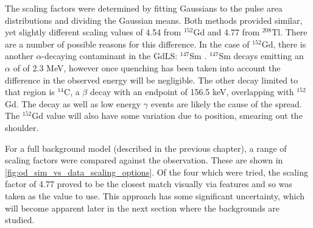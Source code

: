 \par
The scaling factors were determined by fitting Gaussians to the pulse area distributions and dividing the Gaussian means.
Both methods provided similar, yet slightly different scaling values of 4.54 from ${}^{152}$Gd and 4.77 from ${}^{208}$Tl.
There are a number of possible reasons for this difference.
In the case of ${}^{152}$Gd, there is another $\alpha$-decaying contaminant in the GdLS: ${}^{147}$Sm \cite{scotthaselschwardt_thesis_ref}.
${}^{147}$Sm decays emitting an $\alpha$ of of 2.3 MeV, however once quenching has been taken into account the difference in the observed energy will be negligible.
The other decay limited to that region is ${}^{14}$C, a $\beta$ decay with an endpoint of 156.5 keV, overlapping with ${}^{152}$Gd.
The decay as well as low energy $\gamma$ events are likely the cause of the spread.
The ${}^{152}$Gd value will also have some variation due to position, smearing out the shoulder.

\par
For a full background model (described in the previous chapter), a range of scaling factors were compared against the observation.
These are shown in \autoref{fig:od_sim_vs_data_scaling_options}.
Of the four which were tried, the scaling factor of 4.77 proved to be the closest match visually via features and so was taken as the value to use.
This approach has some significant uncertainty, which will become apparent later in the next section where the backgrounds are studied.






